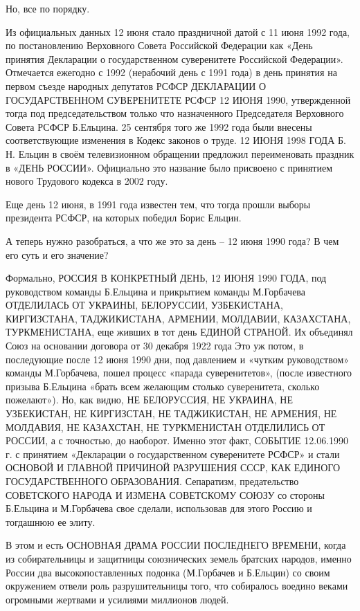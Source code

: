 Но, все по порядку. 

Из официальных данных 12 июня стало праздничной датой с 11 июня 1992 года, по
постановлению Верховного Совета Российской Федерации как «День принятия
Декларации о государственном суверенитете Российской Федерации». Отмечается
ежегодно с 1992 (нерабочий день с 1991 года) в день принятия на первом съезде
народных депутатов РСФСР ДЕКЛАРАЦИИ О ГОСУДАРСТВЕННОМ СУВЕРЕНИТЕТЕ РСФСР 12
ИЮНЯ 1990, утвержденной тогда под председательством только что назначенного
Председателя Верховного Совета РСФСР Б.Ельцина. 25 сентября того же 1992 года
были внесены соответствующие изменения в Кодекс законов о труде. 12 ИЮНЯ 1998
ГОДА Б. Н. Ельцин в своём телевизионном обращении предложил переименовать
праздник в «ДЕНЬ РОССИИ». Официально это название было присвоено с принятием
нового Трудового кодекса в 2002 году.

Еще день 12 июня, в 1991 года известен тем, что тогда прошли выборы президента
РСФСР, на которых победил Борис Ельцин.

А теперь нужно разобраться, а что же это за день – 12 июня 1990 года? В чем его
суть и его значение?

Формально, РОССИЯ В КОНКРЕТНЫЙ ДЕНЬ, 12 ИЮНЯ 1990 ГОДА, под руководством
команды Б.Ельцина и прикрытием команды М.Горбачева ОТДЕЛИЛАСЬ ОТ УКРАИНЫ,
БЕЛОРУССИИ, УЗБЕКИСТАНА, КИРГИЗСТАНА, ТАДЖИКИСТАНА, АРМЕНИИ, МОЛДАВИИ,
КАЗАХСТАНА, ТУРКМЕНИСТАНА, еще живших в тот день ЕДИНОЙ СТРАНОЙ. Их объединял
Союз на основании договора от 30 декабря 1922 года Это уж потом, в последующие
после 12 июня 1990 дни, под давлением и «чутким руководством» команды
М.Горбачева, пошел процесс «парада суверенитетов», (после известного призыва
Б.Ельцина «брать всем желающим столько суверенитета, сколько пожелают»). Но,
как видно, НЕ  БЕЛОРУССИЯ, НЕ УКРАИНА, НЕ УЗБЕКИСТАН, НЕ КИРГИЗСТАН, НЕ
ТАДЖИКИСТАН, НЕ АРМЕНИЯ, НЕ МОЛДАВИЯ, НЕ КАЗАХСТАН, НЕ ТУРКМЕНИСТАН ОТДЕЛИЛИСЬ
ОТ РОССИИ, а с точностью, до наоборот. Именно этот факт, СОБЫТИЕ 12.06.1990 г.
с принятием «Декларации о государственном суверенитете РСФСР» и стали ОСНОВОЙ И
ГЛАВНОЙ ПРИЧИНОЙ РАЗРУШЕНИЯ СССР, КАК ЕДИНОГО ГОСУДАРСТВЕННОГО ОБРАЗОВАНИЯ.
Сепаратизм, предательство СОВЕТСКОГО НАРОДА И ИЗМЕНА СОВЕТСКОМУ СОЮЗУ со
стороны Б.Ельцина и М.Горбачева свое сделали, использовав для этого Россию и
тогдашнюю ее элиту.

В этом и есть ОСНОВНАЯ ДРАМА РОССИИ ПОСЛЕДНЕГО ВРЕМЕНИ, когда из собирательницы
и защитницы союзнических земель братских народов, именно России два
высокопоставленных подонка (М.Горбачев и Б.Ельцин) со своим окружением отвели
роль разрушительницы того, что собиралось воедино веками огромными жертвами и
усилиями миллионов людей.

